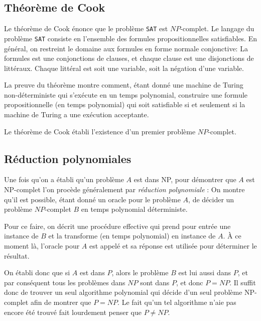 \subsection{Théorème de Cook}

Le théorème de Cook énonce que le problème \texttt{SAT} est $NP$-complet.
Le langage du problème \texttt{SAT} consiste en l'ensemble des formules propositionnelles satisfiables.
En général, on restreint le domaine aux formules en forme normale conjonctive: La formules est une conjonctions de clauses, et chaque clause est une disjonctions de littéraux. Chaque littéral est soit une variable, soit la négation d'une variable.

La preuve du théorème montre comment, étant donné une machine de Turing non-déterministe qui s'exécute en un temps polynomial, construire une formule propositionnelle (en temps polynomial) qui soit satisfiable si et seulement si la machine de Turing a une exécution acceptante.

Le théorème de Cook établi l'existence d'un premier problème $NP$-complet.

\subsection{Réduction polynomiales}

Une fois qu'on a établi qu'un problème $A$ est dans NP, pour démontrer que $A$ est NP-complet l'on procède généralement par \og \textit{réduction polynomiale} \fg{}:
On montre qu'il est possible, étant donné un oracle pour le problème $A$, de décider un problème $NP$-complet $B$ en temps polynomial déterministe.

Pour ce faire, on décrit une procédure effective qui prend pour entrée une instance de $B$ et la transforme (en temps polynomial) en instance de $A$.
À ce moment là, l'oracle pour $A$ est appelé et sa réponse est utilisée pour déterminer le résultat.

On établi donc que si $A$ est dans $P$, alors le problème $B$ est lui aussi dans $P$, et par conséquent tous les problèmes dans $NP$ sont dans $P$, et donc $P = NP$. Il suffit donc de trouver un seul algorithme polynomial qui décide d'un seul problème NP-complet afin de montrer que $P = NP$.
Le fait qu'un tel algorithme n'aie pas encore été trouvé fait lourdement penser que $P \neq NP$.
